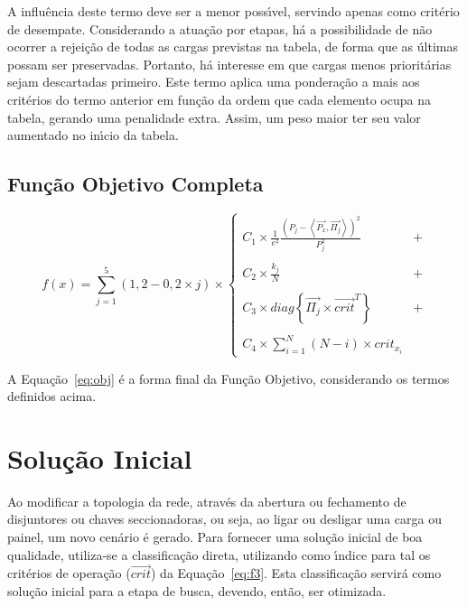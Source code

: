 A influ{\^e}ncia deste termo deve ser a menor poss{\'\i}vel, servindo apenas como crit{\'e}rio de desempate. Considerando a atua{\c c}{\~a}o por etapas, h{\'a} a possibilidade de n{\~a}o ocorrer a rejei{\c c}{\~a}o de todas as cargas previstas na tabela, de forma que as {\'u}ltimas possam ser preservadas. Portanto, h{\'a} interesse em que cargas menos priorit{\'a}rias sejam descartadas primeiro. Este termo aplica uma pondera{\c c}{\~a}o a mais aos crit{\'e}rios do termo anterior em fun{\c c}{\~a}o da ordem que cada elemento ocupa na tabela, gerando uma penalidade extra. Assim, um peso maior ter seu valor aumentado no in{\'\i}cio da tabela.

\subsection{Fun{\c c}{\~a}o Objetivo Completa} \label{subsec:obj}

\begin{equation} \label{eq:obj}
    f\left( x \right) =
    \sum_{j=1}^{5}\left(1,2-0,2\times j\right) \times
    \left\{
        \begin{matrix}
            C_{1} \times \frac{1}{e^{2}}\frac{\left( P_{j} - \left< \vec{P_{x}}, \vec{\Pi_{j}} \right> \right)^{2}}{P_{j}^{2}} & + \\
            & \\
            C_{2} \times \frac{k_{j}}{N} & + \\
            & \\
            C_{3} \times diag\left\{ \vec{\Pi_{j}} \times \vec{crit}^{T} \right\} & + \\
            & \\
            C_{4} \times \sum_{i=1}^{N}{\left(N-i \right) \times crit_{x_{i}}}
        \end{matrix}
    \right.
\end{equation}

A Equa{\c c}{\~a}o~\ref{eq:obj} {\'e} a forma final da Fun{\c c}{\~a}o Objetivo, considerando os termos definidos acima.

\section{Solu{\c c}{\~a}o Inicial} \label{sec:cldir}

Ao modificar a topologia da rede, atrav{\'e}s da abertura ou fechamento de disjuntores ou chaves seccionadoras, ou seja, ao ligar ou desligar uma carga ou painel, um novo cen{\'a}rio {\'e} gerado. Para fornecer uma solu{\c c}{\~a}o inicial de boa qualidade, utiliza-se a classifica{\c c}{\~a}o direta, utilizando como {\'\i}ndice para tal os crit{\'e}rios de opera{\c c}{\~a}o ($\vec{crit}$) da Equa{\c c}{\~a}o~\ref{eq:f3}. Esta classifica{\c c}{\~a}o servir{\'a} como solu{\c c}{\~a}o inicial para a etapa de busca, devendo, ent{\~a}o, ser otimizada.

